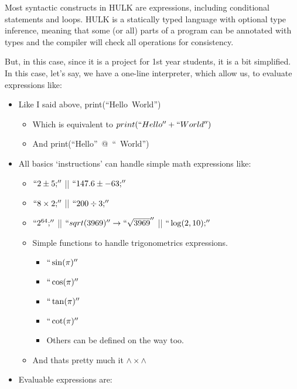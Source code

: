     Most syntactic constructs in HULK are expressions, including conditional statements and loops. HULK is a statically typed language with optional type inference, meaning that some (or all) parts of a program can be annotated with types and the compiler will check all operations for consistency.

     But, in this case, since it is a project for 1st year students, it is a bit simplified.
     In this case, let's say, we have a one-line interpreter, which allow us, to evaluate expressions like:
     \begin{itemize}
        \item Like I said above, \hbox{print{(``Hello World'')}}
            \begin{itemize}
                \item Which is equivalent to \hbox{$print(``Hello'' + `` World'')$}
                \item And \hbox{print{(``Hello'' @ `` World'')}}
            \end{itemize}
        \item All basics `instructions' can handle simple math expressions like:
            \begin{itemize}
                \item $``2 \pm  5;''$ || $``147.6 \pm  -63;''$
                \item $``8 \times  2;''$ || $``200 \div 3;''$
                \item $``2^{64};''$ || $``sqrt(3969)'' \rightarrow  ``\sqrt{3969}''$ || $``\log(2, 10);''$
                \item Simple functions to handle trigonometrics expressions.
                    \begin{itemize}
                        \item $``\sin({\pi})''$ 
                        \item $``\cos({\pi})''$
                        \item $``\tan({\pi})''$
                        \item $``\cot({\pi})''$
                        \item Others can be defined on the way too.
                    \end{itemize}
                \item And thats pretty much it $\land\times \land$ 
            \end{itemize}
        \newpage
        \item Evaluable expressions are:

\end{itemize}
